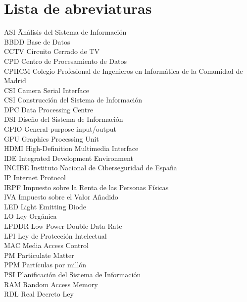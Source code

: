 \newpage %
\thispagestyle{empty}
\mbox{}

\chapter*{Lista de abreviaturas}
\begin{tabbing} %
	ASI \quad\quad\quad\= Análisis del Sistema de Información \\
	BBDD \> Base de Datos \\
	CCTV \> Circuito Cerrado de TV \\
	CPD \> Centro de Procesamiento de Datos \\
	CPIICM \> Colegio Profesional de Ingenieros en Informática de la Comunidad de Madrid \\
	CSI \> Camera Serial Interface \\
	CSI \> Construcción del Sistema de Información \\
	DPC \> Data Processing Centre \\
	DSI \> Diseño del Sistema de Información \\
	GPIO \> General-purpose input/output \\
	GPU \> Graphics Processing Unit \\
	HDMI \> High-Definition Multimedia Interface \\
	IDE \> Integrated Development Environment \\
	INCIBE \> Instituto Nacional de Ciberseguridad de España \\
	IP \> Internet Protocol \\
	IRPF \> Impuesto sobre la Renta de las Personas Físicas \\
	IVA \> Impuesto sobre el Valor Añadido \\
	LED \> Light Emitting Diode \\
	LO \> Ley Orgánica \\
	LPDDR \> Low-Power Double Data Rate \\
	LPI \> Ley de Protección Intelectual \\
	MAC \> Media Access Control \\
	PM \> Particulate Matter \\
	PPM \> Partículas por millón \\
	PSI \> Planificación del Sistema de Información \\
	RAM \> Random Access Memory \\
	RDL \> Real Decreto Ley \\

\end{tabbing}
